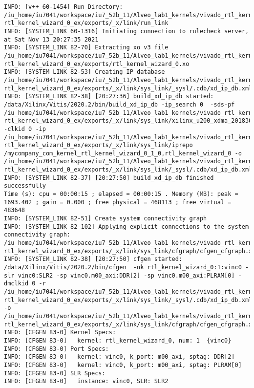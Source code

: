 \begin{lstlisting}[label=code:log_file, caption=Содержимое log-файла, basicstyle=\tiny]
INFO: [v++ 60-1454] Run Directory: /iu_home/iu7041/workspace/iu7_52b_11/Alveo_lab1_kernels/vivado_rtl_kernel/  rtl_kernel_wizard_0_ex/exports/_x/link/run_link
INFO: [SYSTEM_LINK 60-1316] Initiating connection to rulecheck server, at Sat Nov 13 20:27:35 2021
INFO: [SYSTEM_LINK 82-70] Extracting xo v3 file /iu_home/iu7041/workspace/iu7_52b_11/Alveo_lab1_kernels/vivado_rtl_kernel/  rtl_kernel_wizard_0_ex/exports/rtl_kernel_wizard_0.xo
INFO: [SYSTEM_LINK 82-53] Creating IP database /iu_home/iu7041/workspace/iu7_52b_11/Alveo_lab1_kernels/vivado_rtl_kernel/  rtl_kernel_wizard_0_ex/exports/_x/link/sys_link/_sysl/.cdb/xd_ip_db.xml
INFO: [SYSTEM_LINK 82-38] [20:27:36] build_xd_ip_db started: /data/Xilinx/Vitis/2020.2/bin/build_xd_ip_db -ip_search 0  -sds-pf /iu_home/iu7041/workspace/iu7_52b_11/Alveo_lab1_kernels/vivado_rtl_kernel/  rtl_kernel_wizard_0_ex/exports/_x/link/sys_link/xilinx_u200_xdma_201830_2.hpfm -clkid 0 -ip /iu_home/iu7041/workspace/iu7_52b_11/Alveo_lab1_kernels/vivado_rtl_kernel/  rtl_kernel_wizard_0_ex/exports/_x/link/sys_link/iprepo   /mycompany_com_kernel_rtl_kernel_wizard_0_1_0,rtl_kernel_wizard_0 -o /iu_home/iu7041/workspace/iu7_52b_11/Alveo_lab1_kernels/vivado_rtl_kernel/  rtl_kernel_wizard_0_ex/exports/_x/link/sys_link/_sysl/.cdb/xd_ip_db.xml
INFO: [SYSTEM_LINK 82-37] [20:27:50] build_xd_ip_db finished successfully
Time (s): cpu = 00:00:15 ; elapsed = 00:00:15 . Memory (MB): peak = 1693.402 ; gain = 0.000 ; free physical = 468113 ; free virtual = 483648
INFO: [SYSTEM_LINK 82-51] Create system connectivity graph
INFO: [SYSTEM_LINK 82-102] Applying explicit connections to the system connectivity graph: /iu_home/iu7041/workspace/iu7_52b_11/Alveo_lab1_kernels/vivado_rtl_kernel/  rtl_kernel_wizard_0_ex/exports/_x/link/sys_link/cfgraph/cfgen_cfgraph.xml
INFO: [SYSTEM_LINK 82-38] [20:27:50] cfgen started: /data/Xilinx/Vitis/2020.2/bin/cfgen  -nk rtl_kernel_wizard_0:1:vinc0 -slr vinc0:SLR2 -sp vinc0.m00_axi:DDR[2] -sp vinc0.m00_axi:PLRAM[0] -dmclkid 0 -r /iu_home/iu7041/workspace/iu7_52b_11/Alveo_lab1_kernels/vivado_rtl_kernel/  rtl_kernel_wizard_0_ex/exports/_x/link/sys_link/_sysl/.cdb/xd_ip_db.xml -o /iu_home/iu7041/workspace/iu7_52b_11/Alveo_lab1_kernels/vivado_rtl_kernel/  rtl_kernel_wizard_0_ex/exports/_x/link/sys_link/cfgraph/cfgen_cfgraph.xml
INFO: [CFGEN 83-0] Kernel Specs: 
INFO: [CFGEN 83-0]   kernel: rtl_kernel_wizard_0, num: 1  {vinc0}
INFO: [CFGEN 83-0] Port Specs: 
INFO: [CFGEN 83-0]   kernel: vinc0, k_port: m00_axi, sptag: DDR[2]
INFO: [CFGEN 83-0]   kernel: vinc0, k_port: m00_axi, sptag: PLRAM[0]
INFO: [CFGEN 83-0] SLR Specs: 
INFO: [CFGEN 83-0]   instance: vinc0, SLR: SLR2

\end{lstlisting}
